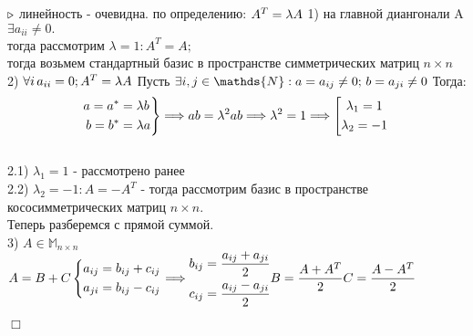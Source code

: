 \documentclass[a4paper,12pt]{report}
\begin{document}
$\\ \triangleright$
линейность - очевидна.
по определению: $A^{T} = \lambda A\\ $
1) на главной диангонали A $\exists a_{ii} \neq 0. $
\\тогда рассмотрим $\lambda = 1: A^{T} = A; $
\\тогда возьмем стандартный базис в пространстве симметрических матриц $n \times n$ 
\\2) $\forall i \, a_{ii} = 0;\\ A^{T} = \lambda A\\$
Пусть $\exists i,j \in \mathds{N}: \\
a=a_{ij}\neq 0; \,b=  a_{ji}\neq 0\\$
Тогда:
\[
\left.
\begin{aligned}
a = a^{*} & =\lambda b\\
b = b^{*} & =\lambda a \\
\end{aligned}
\right\}
\Longrightarrow ab=\lambda^{2} ab \Longrightarrow \lambda^{2}=1 \Longrightarrow \left[ 
\begin{gathered} 
\lambda_{1} = 1
\\ \lambda_{2} = -1
\end{gathered}
\right.\\ \]
\\2.1) $\lambda_{1} = 1$ - рассмотрено ранее\\
2.2) $\lambda_{2} = -1 : A = -A^{T} $ - тогда рассмотрим базис в пространстве кососимметрических матриц $n \times n$.
\\Теперь разберемся с прямой суммой.\\
3)  $ A \in \mathds{M}_{n\times n} $ \\
$ A = B + C \\
\left\{ 
\begin{gathered} 
a_{ij} = b_{ij} + c_{ij}
\\a_{ji} = b_{ij} - c_{ij}
\end{gathered}
\right. \Longrightarrow \begin{gathered} 
b_{ij} = \frac{a_{ij} + a_{ji}}{2}
\\c_{ij} = \frac{a_{ij} - a_{ji}}{2}
\end{gathered}\\
B = \dfrac{A + A^{T}}{2}\\
C = \dfrac{A - A^{T}}{2}$\\
\begin{flushright}
	$\Box$
\end{flushright}
\end{document}
